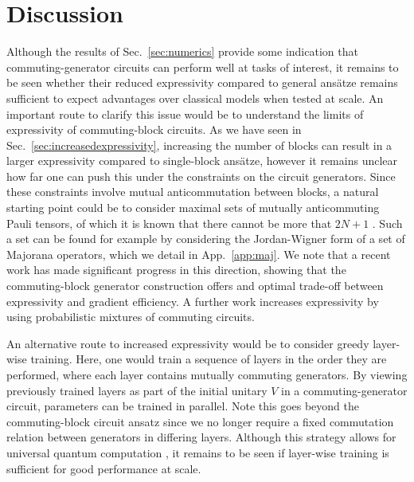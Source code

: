 \documentclass[a4paper,twocolumn,11pt,accepted=2025-09-06]{quantumarticle}
\begin{document}
\section{Discussion}
Although the results of Sec.\ \ref{sec:numerics} provide some indication that commuting-generator circuits can perform well at tasks of interest, it remains to be seen whether their reduced expressivity compared to general ans\"{a}tze remains sufficient to expect advantages over classical models when tested at scale. An important route to clarify this issue would be to understand the limits of expressivity of commuting-block circuits. As we have seen in Sec.\ \ref{sec:increasedexpressivity}, increasing the number of blocks can result in a larger expressivity compared to single-block ans\"{a}tze, however it remains unclear how far one can push this under the constraints on the circuit generators. Since these constraints involve mutual anticommutation between blocks, a natural starting point could be to consider maximal sets of mutually anticommuting Pauli tensors, of which it is known that there cannot be more that $2N+1$ \cite{sarkar2021sets}. Such a set can be found for example by considering the Jordan-Wigner form of a set of Majorana operators, which we detail in App.\ \ref{app:maj}. We note that a recent work \cite{chinzei2024} has made significant progress in this direction, showing that the commuting-block generator construction offers and optimal trade-off between expressivity and gradient efficiency. A further work \cite{coyle2024} increases expressivity by using probabilistic mixtures of commuting circuits.


An alternative route to increased expressivity would be to consider greedy layer-wise training. Here, one would train a sequence of layers in the order they are performed, where each layer contains mutually commuting generators. By viewing previously trained layers as part of the initial unitary $V$ in a commuting-generator circuit, parameters can be trained in parallel. Note this goes beyond the commuting-block circuit ansatz since we no longer require a fixed commutation relation between generators in differing layers. Although this strategy allows for universal quantum computation \cite{lloyd2018quantum}, it remains to be seen if layer-wise training is sufficient for good performance at scale. 
\end{document}
